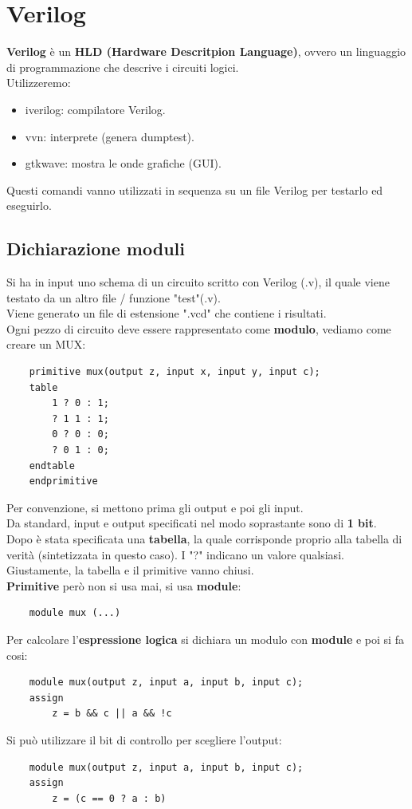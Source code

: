 \documentclass[12pt,a4paper]{article}
\let\oldsection\section
\renewcommand{\section}{\clearpage\oldsection}
\begin{document}
\section{Verilog}
\textbf{Verilog} è un \textbf{HLD (Hardware Descritpion Language)}, ovvero un linguaggio di programmazione che descrive i circuiti logici.\\
Utilizzeremo:
\begin{itemize}
    \item iverilog: compilatore Verilog.
    \item vvn: interprete (genera dumptest).
    \item gtkwave: mostra le onde grafiche (GUI).
\end{itemize}
Questi comandi vanno utilizzati in sequenza su un file Verilog per testarlo ed eseguirlo.
\subsection{Dichiarazione moduli}
Si ha in input uno schema di un circuito scritto con Verilog (.v), il quale viene testato da un altro file / funzione "test"(.v).\\
Viene generato un file di estensione ".vcd" che contiene i risultati.\\
Ogni pezzo di circuito deve essere rappresentato come \textbf{modulo}, vediamo come creare un MUX:
\begin{lstlisting}
    primitive mux(output z, input x, input y, input c);
    table
        1 ? 0 : 1;
        ? 1 1 : 1;
        0 ? 0 : 0;
        ? 0 1 : 0;
    endtable
    endprimitive
\end{lstlisting}
Per convenzione, si mettono prima gli output e poi gli input.\\
Da standard, input e output specificati nel modo soprastante sono di \textbf{1 bit}.\\
Dopo è stata specificata una \textbf{tabella}, la quale corrisponde proprio alla tabella di verità (sintetizzata in questo caso). I "?" indicano un valore qualsiasi.\\
Giustamente, la tabella e il primitive vanno chiusi.\\
\textbf{Primitive} però non si usa mai, si usa \textbf{module}:
\begin{lstlisting}
    module mux (...)
\end{lstlisting}
Per calcolare l'\textbf{espressione logica} si dichiara un modulo con \textbf{module} e poi si fa cosi:
\begin{lstlisting}
    module mux(output z, input a, input b, input c);
    assign 
        z = b && c || a && !c
\end{lstlisting}
Si può utilizzare il bit di controllo per scegliere l'output:
\begin{lstlisting}
    module mux(output z, input a, input b, input c);
    assign 
        z = (c == 0 ? a : b)
\end{lstlisting}
\end{document}
